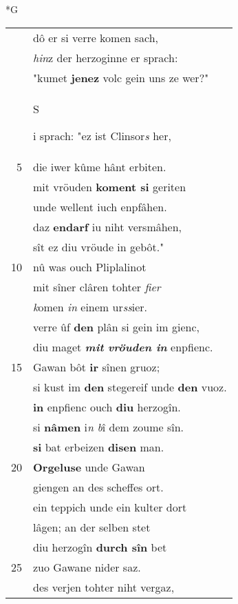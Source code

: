 \documentclass[8pt,a4paper,notitlepage]{article}
\begin{document}
\newpage
\begin{table}[ht]
\begin{minipage}[t]{0.5\linewidth}
\small
\begin{center}*G
\end{center}
\begin{tabular}{rl}
 & dô er si verre komen sach,\\ 
 & \textit{hin}z der herzoginne er sprach:\\ 
 & "kumet \textbf{jenez} volc gein uns ze wer?"\\ 
 & \begin{large}S\end{large}i sprach: "ez ist Clinsor\textit{s} her,\\ 
5 & die iwer kûme hânt erbiten.\\ 
 & mit vröuden \textbf{koment si} geriten\\ 
 & unde wellent iuch enpfâhen.\\ 
 & daz \textbf{en}\textbf{darf} iu niht versmâhen,\\ 
 & sît ez diu vröude in gebôt."\\ 
10 & nû was ouch Pliplalinot\\ 
 & mit sîner clâren tohter \textit{fier}\\ 
 & \textit{k}omen \textit{in} einem ur\textit{ss}ier.\\ 
 & verre ûf \textbf{den} plân si gein im gienc,\\ 
 & diu maget \textbf{\textit{mit} \textit{vröuden in}} enpfienc.\\ 
15 & Gawan bôt \textbf{ir} sînen gruoz;\\ 
 & si kust im \textbf{den} stegereif unde \textbf{den} vuoz.\\ 
 & \textbf{in} enpfienc ouch \textbf{diu} herzogîn.\\ 
 & si \textbf{nâmen} i\textit{n} \textit{b}î dem zoume sîn.\\ 
 & \textbf{si} bat erbeizen \textbf{disen} man.\\ 
20 & \textbf{Orgeluse} unde Gawan\\ 
 & giengen an des scheffes ort.\\ 
 & ein teppich unde ein kulter dort\\ 
 & lâgen; an der selben stet\\ 
 & diu herzogîn \textbf{durch sîn} bet\\ 
25 & zuo Gawane nider saz.\\ 
 & des verjen tohter niht vergaz,\\ 

\end{tabular}
\end{minipage}
\end{table}
\end{document}
